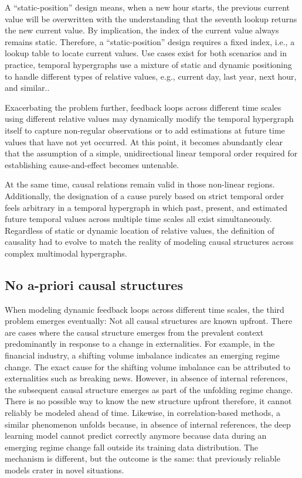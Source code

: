 \documentclass{article}
\begin{document}
\newpage

A “static-position” design means, when a new hour starts, the previous current value will be overwritten with the understanding that the seventh lookup returns the new current value. By implication, the index of the current value always remains static. Therefore, a “static-position” design requires a fixed index, i.e., a lookup table to locate current values. Use cases exist for both scenarios and in practice, temporal hypergraphs use a mixture of static and dynamic positioning to handle different types of relative values, e.g., current day, last year, next hour, and similar..

Exacerbating the problem further, feedback loops across different time scales using different relative values may dynamically modify the temporal hypergraph itself to capture non-regular observations or to add estimations at future time values that have not yet occurred.   
At this point, it becomes abundantly clear that the assumption of a simple, unidirectional linear temporal order required for establishing cause-and-effect becomes untenable.

At the same time, causal relations remain valid in those non-linear regions. Additionally, the designation of a cause purely based on strict temporal order feels arbitrary in a temporal hypergraph in which past, present, and estimated future temporal values across multiple time scales all exist simultaneously. Regardless of static or dynamic location of relative values, the definition of causality had to evolve to match the reality of modeling causal structures across complex multimodal hypergraphs.


\subsection{No a-priori causal structures}

When modeling dynamic feedback loops across different time scales, the third problem emerges eventually: Not all causal structures are known upfront. There are cases where the causal structure emerges from the prevalent context predominantly in response to a change in externalities. For example, in the financial industry, a shifting volume imbalance indicates an emerging regime change. The exact cause for the shifting volume imbalance can be attributed to externalities such as breaking news. However, in absence of internal references, the subsequent  causal structure emerges as part of the unfolding regime change. There is no possible way to know the new structure upfront therefore, it cannot reliably be modeled ahead of time. Likewise, in correlation-based methods, a similar phenomenon unfolds because, in absence of internal references, the deep learning model cannot predict correctly anymore because data during an emerging regime change fall outside its training data distribution. The mechanism is different, but the outcome is the same: that previously reliable models crater in novel situations.
\end{document}
